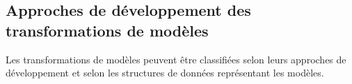 \subsection{Approches de développement des transformations de modèles }
\label{ssec:approches}

%



Les transformations de modèles peuvent être classifiées selon leurs approches
de développement et selon les structures de données représentant les modèles.

